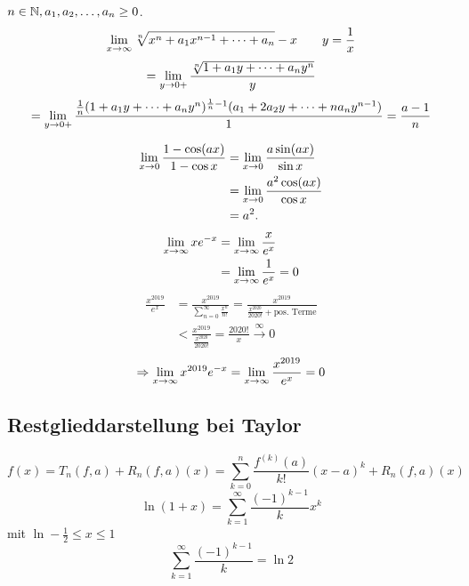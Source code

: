 \documentclass[../ana2.tex]{subfiles}
\begin{document}
\begin{bsp}%
    \( n\in\mathbb{N}, a_1, a_2, \ldots, a_n \geq 0 \).
    \[ \lim\limits_{x\rightarrow\infty} \sqrt[n]{x^n + a_1 x^{n-1} + \cdots + a_n} - x 
    \qquad y = \frac{1}{x} \]
    \[ = \lim\limits_{y\rightarrow{}0+} \frac{ \sqrt[n]{1 + a_1 y + \cdots + a_n y^n} }{y} \]
    \[ = \lim\limits_{y\rightarrow{}0+} \frac{ \frac{1}{n} 
    (1 + a_1 y + \cdots + a_n y^n)^{\frac{1}{n} - 1} 
    (a_1 + 2a_2 y + \cdots + n a_n y^{n-1}) }{ 1 } = \frac{a-1}{n} \]
\end{bsp}
\begin{bsp}
    \begin{align*}
        \lim\limits_{x\rightarrow{}0} \frac{1 - \cos(ax)}{1 - \cos x} 
        &= \lim\limits_{x\rightarrow{}0} \frac{a \sin(ax)}{\sin x} \\
        &= \lim\limits_{x\rightarrow{}0} \frac{a^2 \cos(ax)}{\cos x} \\
        &= a^2.
    \end{align*}
    \begin{align*}
        \lim\limits_{x\rightarrow\infty} x e^{-x} &= \lim\limits_{x\rightarrow\infty} \frac{x}{e^x} \\
        &= \lim\limits_{x\rightarrow\infty} \frac{1}{e^x} = 0
    \end{align*}    
    \begin{align*}
        \frac{x^{2019}}{e^x} 
        &= \frac{x^{2019}}{\sum_{n=0}^{\infty} \frac{x^n}{n!}} 
        = \frac{x^{2019}}{\frac{x^{2020}}{2020!} + \text{pos. Terme}} \\
        &< \frac{x^{2019}}{\frac{x^{2020}}{2020!}}
        = \frac{2020!}{x} \overset{\infty}{\rightarrow} 0
    \end{align*}
    \[ \Rightarrow \lim\limits_{x\rightarrow\infty} x^{2019} e^{-x} 
    = \lim\limits_{x\rightarrow\infty} \frac{x^{2019}}{e^x} = 0 \]
\end{bsp}

\subsection{Restglieddarstellung bei Taylor}

\[ f(x) = T_n(f,a) + R_n(f,a)(x) = \sum_{k=0}^{n} 
\frac{f^{(k)}(a)}{k!}(x-a)^k + R_n(f,a)(x) \]
\[ \ln(1+x) = \sum_{k=1}^{\infty} \frac{(-1)^{k-1}}{k} x^k \]
mit \( \ln -\frac{1}{2} \leq x \leq 1 \)
\[ \sum_{k=1}^{\infty} \frac{(-1)^{k-1}}{k} = \ln 2 \]
\end{document}
